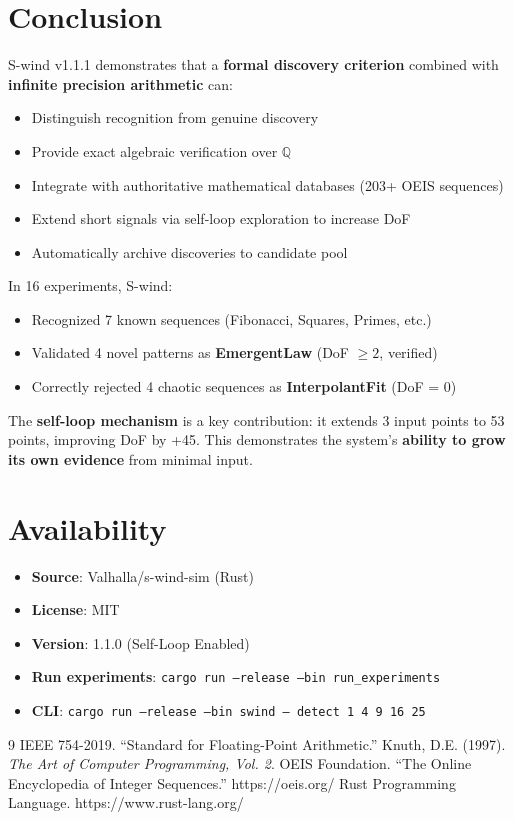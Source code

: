 \documentclass[11pt,a4paper]{article}
\begin{document}
\section{Conclusion}

S-wind v1.1.1 demonstrates that a \textbf{formal discovery criterion} combined with \textbf{infinite precision arithmetic} can:
\begin{itemize}
    \item Distinguish recognition from genuine discovery
    \item Provide exact algebraic verification over $\mathbb{Q}$
    \item Integrate with authoritative mathematical databases (203+ OEIS sequences)
    \item Extend short signals via self-loop exploration to increase DoF
    \item Automatically archive discoveries to candidate pool
\end{itemize}

In 16 experiments, S-wind:
\begin{itemize}
    \item Recognized 7 known sequences (Fibonacci, Squares, Primes, etc.)
    \item Validated 4 novel patterns as \textbf{EmergentLaw} (DoF $\geq 2$, verified)
    \item Correctly rejected 4 chaotic sequences as \textbf{InterpolantFit} (DoF = 0)
\end{itemize}

The \textbf{self-loop mechanism} is a key contribution: it extends 3 input points to 53 points, improving DoF by +45. This demonstrates the system's \textbf{ability to grow its own evidence} from minimal input.

\section*{Availability}

\begin{itemize}
    \item \textbf{Source}: Valhalla/s-wind-sim (Rust)
    \item \textbf{License}: MIT
    \item \textbf{Version}: 1.1.0 (Self-Loop Enabled)
    \item \textbf{Run experiments}: \texttt{cargo run --release --bin run\_experiments}
    \item \textbf{CLI}: \texttt{cargo run --release --bin swind -- detect 1 4 9 16 25}
\end{itemize}

\begin{thebibliography}{9}
 IEEE 754-2019. ``Standard for Floating-Point Arithmetic.''
 Knuth, D.E. (1997). \textit{The Art of Computer Programming, Vol. 2}.
 OEIS Foundation. ``The Online Encyclopedia of Integer Sequences.'' https://oeis.org/
 Rust Programming Language. https://www.rust-lang.org/
\end{thebibliography}
\end{document}
